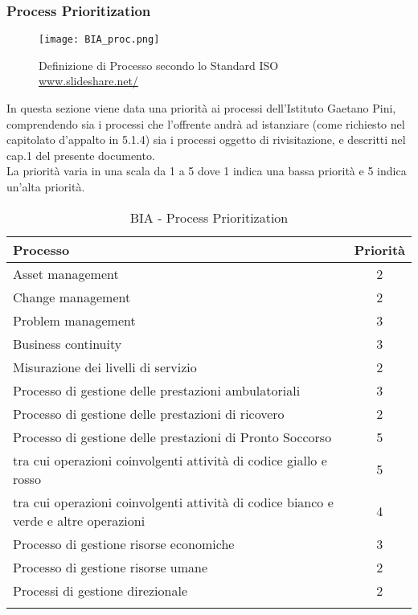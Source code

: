\subsubsection{Process Prioritization}
\begin{figure}[H]
\centering
\texttt{[image: BIA\_proc.png]}
\caption{Definizione di Processo secondo lo Standard ISO \href{https://www.slideshare.net/TheBCEye/isos-newest-standard-the-bia-iso-22317}{www.slideshare.net/}}
\end{figure}
In questa sezione viene data una priorità ai processi dell'Istituto Gaetano Pini, comprendendo sia i processi che l'offrente andrà ad istanziare (come richiesto nel capitolato d'appalto in 5.1.4) sia i processi oggetto di rivisitazione, e descritti nel cap.1 del presente documento.\\
La priorità varia in una scala da 1 a 5 dove 1 indica una bassa priorità e 5 indica un'alta priorità.\\
\renewcommand\arraystretch{1,5}
\begin{longtable}{p{8cm} c}
\toprule
\textbf{Processo} & \textbf{Priorità} \\
\toprule
Asset management & 2 \\
Change management & 2 \\
Problem management & 3 \\
Business continuity & 3 \\
Misurazione dei livelli di servizio & 2 \\
Processo di gestione delle prestazioni ambulatoriali & 3 \\
Processo di gestione delle prestazioni di ricovero & 2 \\
Processo di gestione delle prestazioni di Pronto Soccorso & 5\\
\small{\hspace{1cm} tra cui operazioni coinvolgenti attività di codice giallo e rosso} & 5\\
\small{\hspace{0.5cm} tra cui operazioni coinvolgenti attività di codice bianco e verde e altre operazioni} & 4\\
Processo di gestione risorse economiche & 3 \\
Processo di gestione risorse umane & 2 \\
Processi di gestione direzionale & 2 \\
\bottomrule
\caption{BIA - Process Prioritization}
\end{longtable}

